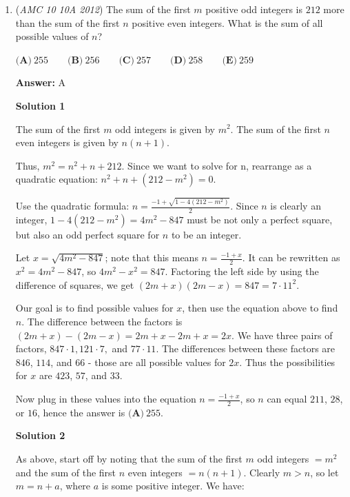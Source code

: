 \begin{enumerate}
 \href{https://artofproblemsolving.com/videos/amc/2012amc10a/249}{https://artofproblemsolving.com/videos/amc/2012amc10a/249}

 


	\item (\textit{AMC 10 10A 2012}) The sum of the first $m$ positive odd integers is $212$ more than the sum of the first $n$ positive even integers. What is the sum of all possible values of $n$?


 $\textbf{(A)}\ 255\qquad\textbf{(B)}\ 256\qquad\textbf{(C)}\ 257\qquad\textbf{(D)}\ 258\qquad\textbf{(E)}\ 259$

 \textbf{Answer: }A



\textbf{Solution 1}

The sum of the first $m$ odd integers is given by $m^2$. The sum of the first $n$ even integers is given by $n(n+1)$.

 Thus, $m^2 = n^2 + n + 212$. Since we want to solve for n, rearrange as a quadratic equation: $n^2 + n + (212 - m^2) = 0$.

 
Use the quadratic formula: $n = \frac{-1 + \sqrt{1 - 4(212 - m^2)}}{2}$. Since $n$ is clearly an integer, $1 - 4(212 - m^2) = 4m^2 - 847$ must be not only a perfect square, but also an odd perfect square for $n$ to be an integer.

 
Let $x = \sqrt{4m^2 - 847}$; note that this means $n = \frac{-1 + x}{2}$. It can be rewritten as $x^2 = 4m^2 - 847$, so $4m^2 - x^2 = 847$. Factoring the left side by using the difference of squares, we get $(2m + x)(2m - x) = 847 = 7\cdot11^2$.

 
Our goal is to find possible values for $x$, then use the equation above to find $n$. The difference between the factors is $(2m + x) - (2m - x) = 2m + x - 2m + x = 2x.$ We have three pairs of factors, $847\cdot1, 121\cdot 7,$ and $77\cdot 11$. The differences between these factors are $846$, $114$, and $66$ - those are all possible values for $2x$. Thus the possibilities for $x$ are $423$, $57$, and $33$. 

 Now plug in these values into the equation $n = \frac{-1 + x}{2}$, so $n$ can equal $211$, $28$, or $16$, hence the answer is $\boxed{\textbf{(A)}\ 255}$.

 



\textbf{Solution 2}

As above, start off by noting that the sum of the first $m$ odd integers $= m^2$ and the sum of the first $n$ even integers $= n(n+1)$. Clearly $m > n$, so let $m = n + a$, where $a$ is some positive integer. We have:


\end{enumerate}
